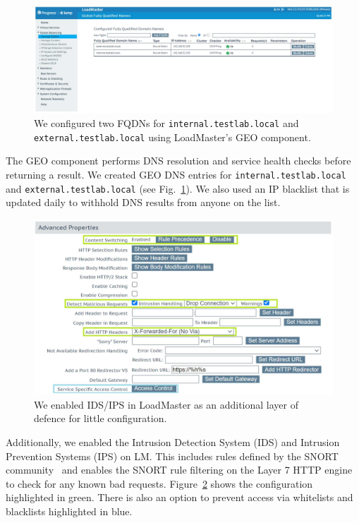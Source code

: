 \begin{figure}
  \centerline{\includegraphics[width=\textwidth]{img/loadmaster-geo}}
  \caption{We configured two FQDNs for \texttt{internal.testlab.local}
    and \texttt{external.testlab.local} using LoadMaster's GEO
    component.}\label{fig:loadmaster-geo}
\end{figure}

The GEO component performs DNS resolution and service health checks
before returning a result.  We created GEO DNS entries for
\texttt{internal.testlab.local} and \texttt{external.testlab.local}
(see Fig.~\ref{fig:loadmaster-geo}).  We also used an IP blacklist
that is updated daily to withhold DNS results from anyone on the list.

\begin{figure}
  \centerline{\includegraphics[width=\textwidth]{img/loadmaster-ids-ips}}
  \caption{We enabled IDS/IPS in LoadMaster as an additional layer of
    defence for little configuration.}\label{fig:loadmaster-ids-ips}
\end{figure}

Additionally, we enabled the Intrusion Detection System (IDS) and
Intrusion Prevention Systems (IPS) on LM.  This includes rules defined
by the SNORT community~\cite{cisco-snort-xx} and enables the SNORT
rule filtering on the Layer 7 HTTP engine to check for any known bad
requests.  Figure~\ref{fig:loadmaster-ids-ips} shows the configuration
highlighted in green.  There is also an option to prevent access via
whitelists and blacklists highlighted in blue.

